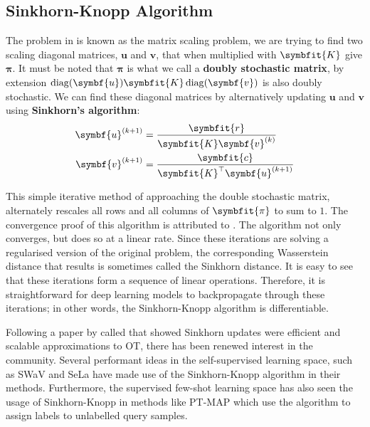 \subsection{Sinkhorn-Knopp Algorithm}\label{ssec:ot-sk}
The problem in  is known as the matrix scaling problem, we are trying to find two scaling diagonal matrices, $\symbf{u}$ and $\symbf{v}$, that when multiplied with $\symbfit{K}$ give $\symbf{\pi}$. It must be noted that $\symbf{\pi}$ is what we call a \textbf{doubly stochastic matrix}, by extension $\operatorname{diag}(\symbf{u}) \symbfit{K} \operatorname{diag}(\symbf{v})$ is also doubly stochastic.
We can find these diagonal matrices by alternatively updating $\symbf{u}$ and $\symbf{v}$ using \textbf{Sinkhorn's algorithm}:
\begin{align}
\symbf{u}^{(k+1)} &= \frac{\symbfit{r}}{\symbfit{K}\symbf{v}^{(k)}}\\
\symbf{v}^{(k+1)} &= \frac{\symbfit{c}}{\symbfit{K}^{\top}\symbf{u}^{(k+1)}}
\end{align}

This simple iterative method of approaching the double stochastic matrix, alternately rescales all rows and all columns of $\symbfit{\pi}$ to sum to $1$. The convergence proof of this algorithm is attributed to \textcite{Sinkhorn1967}. The algorithm not only converges, but does so at a linear rate. 
Since these iterations are solving a regularised version of the original problem, the corresponding Wasserstein distance that results is sometimes called the Sinkhorn distance. 
It is easy to see that these iterations form a sequence of linear operations. Therefore, it is straightforward for deep learning models to backpropagate through these iterations; in other words, the Sinkhorn-Knopp algorithm is differentiable.

Following a paper by \textcite{cuturi2013sinkhorn} called  that showed Sinkhorn updates were efficient and scalable approximations to OT, there has been renewed interest in the community.
Several performant ideas in the self-supervised learning space, such as SWaV \parencite{caron2020unsupervised} and SeLa \parencite{asano2019self} have made use of the Sinkhorn-Knopp algorithm in their methods. Furthermore, the supervised few-shot learning space has also seen the usage of Sinkhorn-Knopp in methods like PT-MAP \parencite{hu2021leveraging} which use the algorithm to assign labels to unlabelled query samples.



